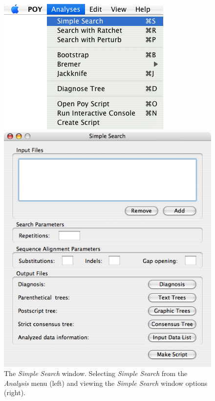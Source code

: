 \begin{figure}
\centering
\begin{minipage}[c]{0.48\textwidth}
   		\includegraphics[width=\textwidth]{figures/SimpleSearch_Menu.jpg}
\end{minipage}
\quad
\begin{minipage}[c]{0.48\textwidth}
	   	\includegraphics[width=\textwidth]{figures/SimpleSearch_Window.jpg}
   	\end{minipage}
	
\caption{The \emph{Simple Search} window. Selecting \emph{Simple Search} from the \emph{Analysis} menu (left) and viewing the \emph{Simple Search} window options (right).}
\label{fig:simple_search_window}
\end{figure}

